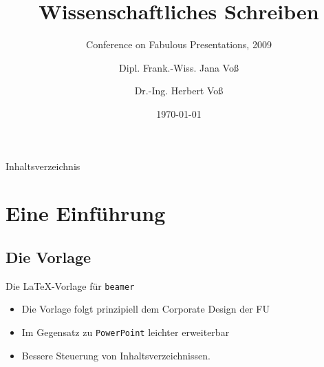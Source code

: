 \documentclass[t,smaller,compress]{beamer}
\begin{document}
\title{Wissenschaftliches Schreiben}
\subtitle{Conference on Fabulous Presentations, 2009}
\author{Dipl. Frank.-Wiss. Jana Voß \and Dr.-Ing. Herbert Voß}
\date{\today}
\maketitle

\begin{frame}{Inhaltsverzeichnis}
\tableofcontents
\end{frame}

\section{Eine Einführung}
\subsection{Die Vorlage}
\begin{frame}{Die \LaTeX-Vorlage für \texttt{beamer}}
\begin{itemize}[<+-| alert@+>]
\item Die Vorlage folgt prinzipiell dem Corporate Design der FU
\item Im Gegensatz zu \texttt{PowerPoint} leichter erweiterbar
\item Bessere Steuerung von Inhaltsverzeichnissen.
\end{itemize}
\end{frame}
\end{document}
